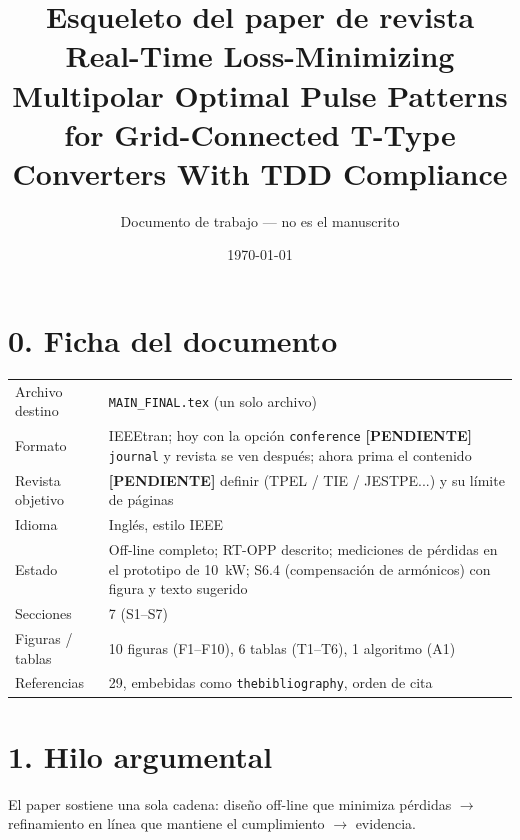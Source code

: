 \documentclass[11pt,a4paper]{article}
\title{\textbf{Esqueleto del paper de revista}\\[2mm]
\large Real-Time Loss-Minimizing Multipolar Optimal Pulse Patterns\\
for Grid-Connected T-Type Converters With TDD Compliance}
\author{Documento de trabajo --- no es el manuscrito}
\date{\today}
\newcommand{\pendiente}[1]{{\color{Warn}\textbf{[PENDIENTE]} #1}}
\begin{document}
\maketitle

\section*{0. Ficha del documento}

\noindent\begin{tabularx}{\textwidth}{lX}
\toprule
Archivo destino    & \texttt{MAIN\_FINAL.tex} (un solo archivo) \\
Formato            & IEEEtran; hoy con la opción \texttt{conference}
                     \pendiente{\texttt{journal} y revista se ven después;
                     ahora prima el contenido} \\
Revista objetivo   & \pendiente{definir (TPEL / TIE / JESTPE...) y su límite de páginas} \\
Idioma             & Inglés, estilo IEEE \\
Estado             & Off-line completo; RT-OPP descrito; mediciones de
                     pérdidas en el prototipo de 10~kW; S6.4 (compensación
                     de armónicos) con figura y texto sugerido \\
Secciones          & 7 (S1--S7) \\
Figuras / tablas   & 10 figuras (F1--F10), 6 tablas (T1--T6), 1 algoritmo (A1) \\
Referencias        & 29, embebidas como \texttt{thebibliography}, orden de cita \\
\bottomrule
\end{tabularx}

\section*{1. Hilo argumental}

El paper sostiene una sola cadena: diseño off-line que minimiza pérdidas
$\rightarrow$ refinamiento en línea que mantiene el cumplimiento
$\rightarrow$ evidencia.
\end{document}
